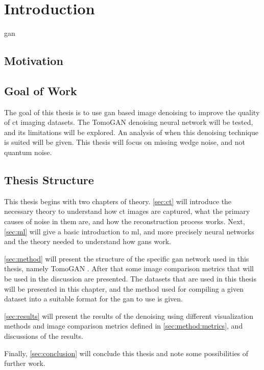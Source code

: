 \chapter{Introduction}
\label{sec:introduction}
\todo[inline]{}
\acrfull{gan}

\section{Motivation}

\section{Goal of Work}
\todo[inline]{}
The goal of this thesis is to use \acrshort{gan} based image denoising to improve the quality of \acrshort{ct} imaging datasets. The TomoGAN \cite{liu2020tomogan} denoising neural network will be tested, and its limitations will be explored. An analysis of when this denoising technique is suited will be given. This thesis will focus on missing wedge noise, and not quantum noise. 

\section{Thesis Structure}
This thesis begins with two chapters of theory. \cref{sec:ct} will introduce the necessary theory to understand how \acrshort{ct} images are captured, what the primary causes of noise in them are, and how the reconstruction process works. Next, \cref{sec:ml} will give a basic introduction to \acrfull{ml}, and more precisely neural networks and the theory needed to understand how \acrshort{gan}s work. 

\cref{sec:method} will present the structure of the specific \acrshort{gan} network used in this thesis, namely TomoGAN \cite{liu2020tomogan}. After that some image comparison metrics that will be used in the discussion are presented. The datasets that are used in this thesis will be presented in this chapter, and the method used for compiling a given dataset into a suitable format for the \acrshort{gan} to use is given. 

\cref{sec:results} will present the results of the denoising using different visualization methods and image comparison metrics defined in \cref{sec:method:metrics}, and discussions of the results. 

Finally, \cref{sec:conclusion} will conclude this thesis and note some possibilities of further work. 